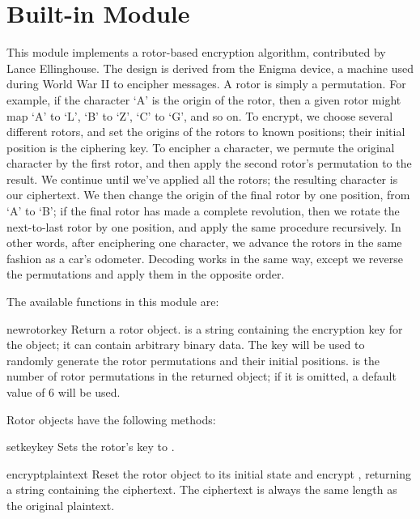 \section{Built-in Module }
\label{module-rotor}

This module implements a rotor-based encryption algorithm, contributed by
Lance Ellinghouse.  The design is derived from the Enigma device, a machine
used during World War II to encipher messages.  A rotor is simply a
permutation.  For example, if the character `A' is the origin of the rotor,
then a given rotor might map `A' to `L', `B' to `Z', `C' to `G', and so on.
To encrypt, we choose several different rotors, and set the origins of the
rotors to known positions; their initial position is the ciphering key.  To
encipher a character, we permute the original character by the first rotor,
and then apply the second rotor's permutation to the result. We continue
until we've applied all the rotors; the resulting character is our
ciphertext.  We then change the origin of the final rotor by one position,
from `A' to `B'; if the final rotor has made a complete revolution, then we
rotate the next-to-last rotor by one position, and apply the same procedure
recursively.  In other words, after enciphering one character, we advance
the rotors in the same fashion as a car's odometer. Decoding works in the
same way, except we reverse the permutations and apply them in the opposite
order.

The available functions in this module are:

\begin{funcdesc}{newrotor}{key}
Return a rotor object.  is a string containing the encryption key
for the object; it can contain arbitrary binary data. The key will be used
to randomly generate the rotor permutations and their initial positions.
 is the number of rotor permutations in the returned object;
if it is omitted, a default value of 6 will be used.
\end{funcdesc}

Rotor objects have the following methods:

\begin{funcdesc}{setkey}{key}
Sets the rotor's key to .
\end{funcdesc}

\begin{funcdesc}{encrypt}{plaintext}
Reset the rotor object to its initial state and encrypt ,
returning a string containing the ciphertext.  The ciphertext is always the
same length as the original plaintext.
\end{funcdesc}

